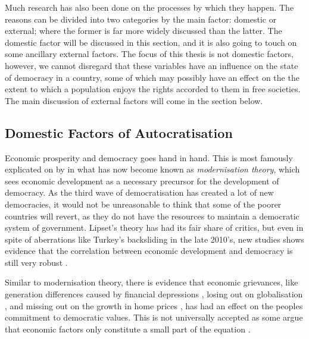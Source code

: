 Much research has also been done on the processes by which they happen. The reasons can be divided into two categories by the main factor: domestic or external; where the former is far more widely discussed than the latter. The domestic factor will be discussed in this section, and it is also going to touch on some ancillary external factors. The focus of this thesis is not domestic factors, however, we cannot disregard that these variables have an influence on the state of democracy in a country, some of which may possibly have an effect on the the extent to which a population enjoys the rights accorded to them in free societies. The main discussion of external factors will come in the section below.

\subsection{Domestic Factors of Autocratisation}
Economic prosperity and democracy goes hand in hand. This is most famously explicated on by \citet{lipset_social_1959} in what has now become known as \textit{modernisation theory}, which sees economic development as a necessary precursor for the development of democracy. As the third wave of democratisation has created a lot of new democracies, it would not be unreasonable to think that some of the poorer countries will revert, as they do not have the resources to maintain a democratic system of government. Lipset's theory has had its fair share of critics, but even in spite of aberrations like Turkey's backsliding in the late 2010's, new studies shows evidence that the correlation between economic development and democracy is still very robust \citep{brownlee_limited_2017}.

Similar to modernisation theory, there is evidence that economic grievances, like generation differences caused by financial depressions \citep[pp. 132-174]{norris_cultural_2019}, losing out on globalisation \citep{ballard-rosa_economic_2021}, and missing out on the growth in home prices \citep{ansell_sheltering_2022}, has had an effect on the peoples commitment to democratic values. This is not universally accepted as some argue that economic factors only constitute a small part of the equation \citep{margalit_economic_2019}.

